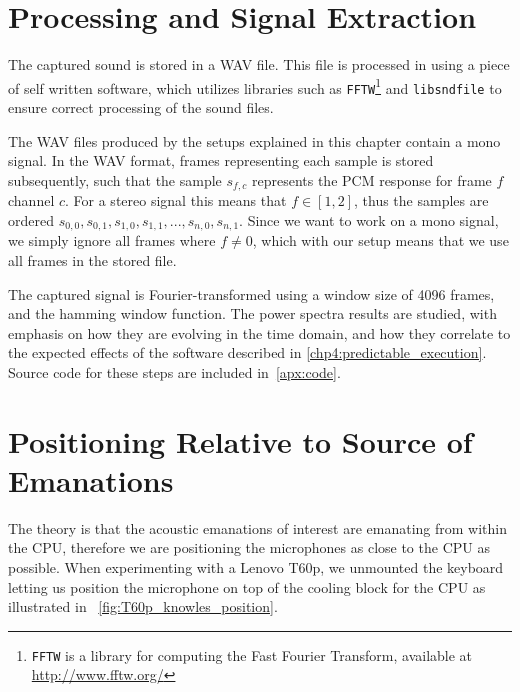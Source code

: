 \section{Processing and Signal Extraction}\label{chp3:sec:processing_signal_extraction}
The captured sound is stored in a \gls{WAV} file.
This file is processed in using a piece of self written software, which utilizes libraries such as \texttt{FFTW}\footnote{\texttt{FFTW} is a library for computing the Fast Fourier Transform, available at \url{http://www.fftw.org/}} and \texttt{libsndfile}\footnotemark{} to ensure correct processing of the sound files.


The \gls{WAV} files produced by the setups explained in this chapter contain a mono signal. 
In the \gls{WAV} format, frames representing each sample is stored subsequently, such that the sample \( s_{f,c} \) represents the \gls{PCM} response for frame \( f \) channel \( c \).
For a stereo signal this means that \( f \in \left [ 1, 2 \right ] \), thus the samples are ordered  \( s_{0,0}, s_{0,1}, s_{1,0}, s_{1,1}, ... , s_{n,0}, s_{n,1} \).
Since we want to work on a mono signal, we simply ignore all frames where \( f \neq 0 \), which with our setup means that we use all frames in the stored file.

The captured signal is Fourier-transformed using a window size of 4096 frames, and the hamming window function. The power spectra results are studied, with emphasis on how they are evolving in the time domain, and how they correlate to the expected effects of the software described in \autoref{chp4:predictable_execution}.
Source code for these steps are included in~\autoref{apx:code}.

\section{Positioning Relative to Source of Emanations}\label{chp3:sec:capturing_audio_fingerprint}
The theory is that the acoustic emanations of interest are emanating from within the \gls{CPU}, therefore we are positioning the microphones as close to the \gls{CPU} as possible. 
When experimenting with a Lenovo T60p, we unmounted the keyboard letting us position the microphone on top of the cooling block for the \gls{CPU} as illustrated in ~\autoref{fig:T60p_knowles_position}.

